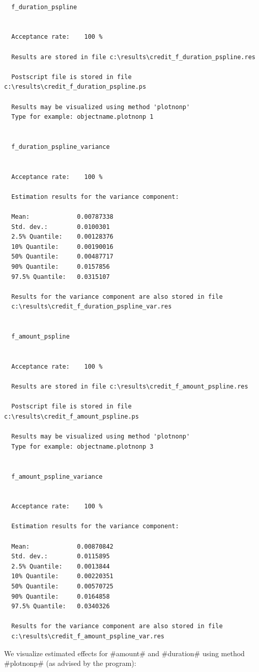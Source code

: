 \begin{verbatim}

  f_duration_pspline


  Acceptance rate:    100 %

  Results are stored in file c:\results\credit_f_duration_pspline.res

  Postscript file is stored in file c:\results\credit_f_duration_pspline.ps

  Results may be visualized using method 'plotnonp'
  Type for example: objectname.plotnonp 1


  f_duration_pspline_variance


  Acceptance rate:    100 %

  Estimation results for the variance component:

  Mean:             0.00787338
  Std. dev.:        0.0100301
  2.5% Quantile:    0.00128376
  10% Quantile:     0.00190016
  50% Quantile:     0.00487717
  90% Quantile:     0.0157856
  97.5% Quantile:   0.0315107

  Results for the variance component are also stored in file
  c:\results\credit_f_duration_pspline_var.res


  f_amount_pspline


  Acceptance rate:    100 %

  Results are stored in file c:\results\credit_f_amount_pspline.res

  Postscript file is stored in file c:\results\credit_f_amount_pspline.ps

  Results may be visualized using method 'plotnonp'
  Type for example: objectname.plotnonp 3


  f_amount_pspline_variance


  Acceptance rate:    100 %

  Estimation results for the variance component:

  Mean:             0.00870842
  Std. dev.:        0.0115895
  2.5% Quantile:    0.0013844
  10% Quantile:     0.00220351
  50% Quantile:     0.00570725
  90% Quantile:     0.0164858
  97.5% Quantile:   0.0340326

  Results for the variance component are also stored in file
  c:\results\credit_f_amount_pspline_var.res
\end{verbatim}


\normalsize


We  visualize estimated effects for #amount# and #duration# using
method #plotnonp# (as advised by the program):

